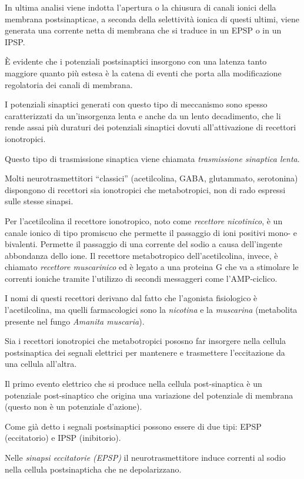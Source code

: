 \documentclass[]{article}
\begin{document}
In ultima analisi viene indotta l'apertura o la chiusura di canali
ionici della membrana postsinapticae, a seconda della selettività ionica
di questi ultimi, viene generata una corrente netta di membrana che si
traduce in un EPSP o in un IPSP.

È evidente che i potenziali postsinaptici insorgono con una latenza
tanto maggiore quanto più estesa è la catena di eventi che porta alla
modificazione regolatoria dei canali di membrana.

I potenziali sinaptici generati con questo tipo di meccanismo sono
spesso caratterizzati da un'insorgenza lenta e anche da un lento
decadimento, che li rende assai più duraturi dei potenziali sinaptici
dovuti all'attivazione di recettori ionotropici.

Questo tipo di trasmissione sinaptica viene chiamata \emph{trasmissione
sinaptica lenta}.

Molti neurotrasmettitori ``classici'' (acetilcolina, GABA, glutammato,
serotonina) dispongono di recettori sia ionotropici che metabotropici,
non di rado espressi sulle stesse sinapsi.

Per l'acetilcolina il recettore ionotropico, noto come \emph{recettore
nicotinico}, è un canale ionico di tipo promiscuo che permette il
passaggio di ioni positivi mono- e bivalenti. Permette il passaggio di
una corrente del sodio a causa dell'ingente abbondanza dello ione. Il
recettore metabotropico dell'acetilcolina, invece, è chiamato
\emph{recettore muscarinico} ed è legato a una proteina G che va a
stimolare le correnti ioniche tramite l'utilizzo di secondi messaggeri
come l'AMP-ciclico.

I nomi di questi recettori derivano dal fatto che l'agonista fisiologico
è l'acetilcolina, ma quelli farmacologici sono la \emph{nicotina} e la
\emph{muscarina} (metabolita presente nel fungo \emph{Amanita
muscaria}).

Sia i recettori ionotropici che metabotropici pososno far insorgere
nella cellula postsinaptica dei segnali elettrici per mantenere e
trasmettere l'eccitazione da una cellula all'altra.

Il primo evento elettrico che si produce nella cellula post-sinaptica è
un potenziale post-sinaptico che origina una variazione del potenziale
di membrana (questo non è un potenziale d'azione).

Come già detto i segnali postsinaptici possono essere di due tipi: EPSP
(eccitatorio) e IPSP (inibitorio).

Nelle \emph{sinapsi eccitatorie (EPSP)} il neurotrasmettitore induce
correnti al sodio nella cellula postsinapticha che ne depolarizzano.
\end{document}
